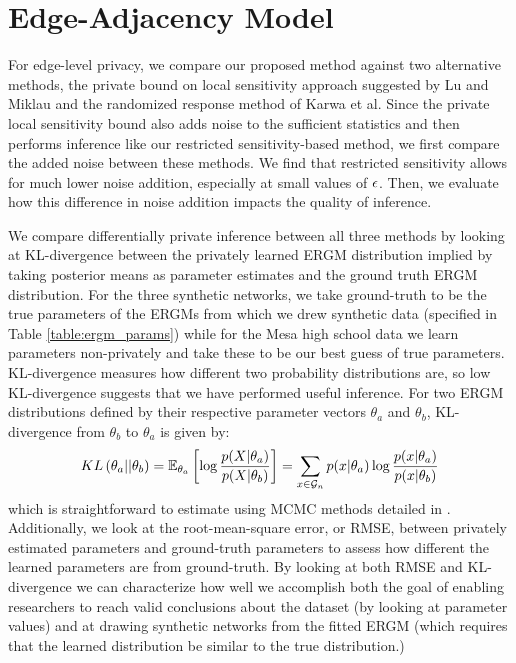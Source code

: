  \section{Edge-Adjacency Model}
 
For edge-level privacy, we compare our proposed method against two alternative methods, the private bound on local sensitivity approach suggested by Lu and Miklau \cite{LM14} and the randomized response method of Karwa et al. \cite{KKS17} Since the private local sensitivity bound also adds noise to the sufficient statistics and then performs inference like our restricted sensitivity-based method, we first compare the added noise between these methods. We find that restricted sensitivity allows for much lower noise addition, especially at small values of $\epsilon$. Then, we evaluate how this difference in noise addition impacts the quality of inference. 

We compare differentially private inference between all three methods by looking at KL-divergence between the privately learned ERGM distribution implied by taking posterior means as parameter estimates and the ground truth ERGM distribution. For the three synthetic networks, we take ground-truth to be the true parameters of the ERGMs from which we drew synthetic data (specified in Table \ref{table:ergm_params}) while for the Mesa high school data we learn parameters non-privately and take these to be our best guess of true parameters.  KL-divergence measures how different two probability distributions are, so low KL-divergence suggests that we have performed useful inference. For two ERGM distributions defined by their respective parameter vectors $\theta_a$ and $\theta_b$, KL-divergence from $\theta_b$ to $\theta_a$ is given by:
$$KL\left({\theta}_a || {\theta}_b\right) = \mathbb{E}_{{\theta}_a} \left[\log \frac{p(X | \theta_a)} {p(X | \theta_b) } \right] = \sum_{x \in \mathcal{G}_n} p(x | \theta_a) \log \frac{p(x | \theta_a)} {p(x | \theta_b)}$$
which is straightforward to estimate using MCMC methods detailed in \cite{HG10}. Additionally, we look at the root-mean-square error, or RMSE, between privately estimated parameters and ground-truth parameters to assess how different the learned parameters are from ground-truth. By looking at both RMSE and KL-divergence we can characterize how well we accomplish both the goal of enabling researchers to reach valid conclusions about the dataset (by looking at parameter values) and at drawing synthetic networks from the fitted ERGM (which requires that the learned distribution be similar to the true distribution.)
 
